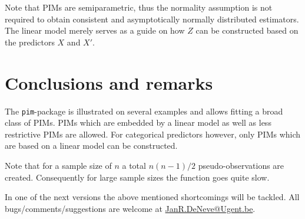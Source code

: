 \documentclass[12pt]{article}
\begin{document}
Note that PIMs are semiparametric, thus the normality assumption is not required to obtain consistent and asymptotically normally distributed estimators. The linear model merely serves as a guide on how $Z$ can be constructed based on the predictors $X$ and $X'$.

\section{Conclusions and remarks}\label{S_conclusion}


The \texttt{pim}-package is illustrated on several examples and allows fitting a broad class of PIMs. PIMs which are embedded by a linear model as well as less restrictive PIMs are allowed. For categorical predictors however, only PIMs which are based on a linear model can be constructed.


Note that for a sample size of $n$ 	a total $n(n-1)/2$ pseudo-observations are created. Consequently for large sample sizes the function goes quite slow.  

In one of the next versions the above mentioned shortcomings will be tackled. All bugs/comments/suggestions are welcome at \href{mailto:JanR.DeNeve@Ugent.be}{JanR.DeNeve@Ugent.be}.




\end{document}

